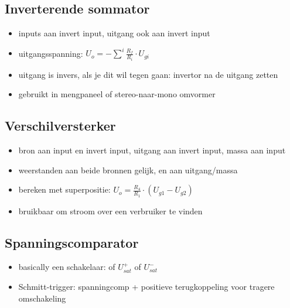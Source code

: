 \documentclass[11pt]{article}
\let\originalitem\item
\renewcommand{\item}{\originalitem[]}
\newcommand{\Newpage}{\end{preview}\begin{preview}}
\begin{document}
\begin{preview}
\Newpage
\section{Inverterende sommator}

\begin{itemize}
  \item inputs aan invert input, uitgang ook aan invert input
  \item uitgangsspanning: $ U_o = - \sum^i{\frac{R_f}{R_i}\cdot U_{gi}} $
  \item uitgang is invers, als je dit wil tegen gaan: invertor na de uitgang zetten
  \item gebruikt in mengpaneel of stereo-naar-mono omvormer
\end{itemize}

\Newpage
\section{Verschilversterker}

\begin{itemize}
  \item bron aan input en invert input, uitgang aan invert input, massa aan input
  \item weerstanden aan beide bronnen gelijk, en aan uitgang/massa
  \item bereken met superpositie: $ U_o = \frac{R_4}{R_1} \cdot (U_{g1} - U_{g2}) $
  \item bruikbaar om stroom over een verbruiker te vinden
\end{itemize}

\Newpage
\section{Spanningscomparator}

\begin{itemize}
  \item basically een schakelaar: of $ U_{sat}^+ $ of $ U_{sat}^- $
  \item Schmitt-trigger: spanningcomp + positieve terugkoppeling voor tragere omschakeling
\end{itemize}


\end{preview}
\end{document}
